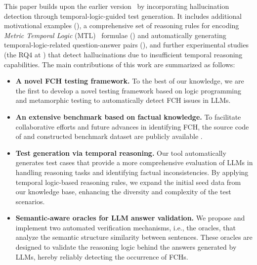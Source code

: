 This paper builds upon the earlier version~\cite{DBLP:journals/pacmpl/LiL0SW024} by incorporating hallucination detection through temporal-logic-guided test generation. It includes additional motivational examples (), a comprehensive set of reasoning rules for encoding \emph{Metric Temporal Logic} (MTL)~\cite{DBLP:conf/lics/OuaknineW05} formulae () and automatically generating temporal-logic-related question-answer pairs (), and further experimental studies (the {RQ4} at ) that detect hallucinations due to insufficient temporal reasoning capabilities. The main contributions of this work are summarized as follows: 
\begin{itemize}[itemsep=1mm,leftmargin=0.35cm]
\item 
\textbf{A novel FCH testing framework.} 
To the best of our knowledge, 
we are the first to develop a novel testing framework based on logic programming and metamorphic testing to automatically detect FCH issues in LLMs. %
\item \textbf{An extensive benchmark based on factual knowledge.} 
To facilitate collaborative efforts and future advances in identifying FCH, 
the source code of \tool and constructed benchmark dataset are publicly available  \cite{drowzee}. 
\item \textbf{Test generation via temporal reasoning.} 
Our tool automatically generates test cases that provide a more comprehensive evaluation of LLMs in handling reasoning tasks and identifying factual inconsistencies. By applying temporal logic-based reasoning rules, we expand the initial seed data from our knowledge base, enhancing the diversity and complexity of the test scenarios. 

\item \textbf{Semantic-aware oracles for LLM answer validation.} We propose and implement two automated verification mechanisms, i.e., the oracles, that analyze the semantic structure similarity between sentences. These oracles are designed to validate the reasoning logic behind the answers generated by LLMs, hereby reliably detecting the occurrence of FCHs. 

\end{itemize}


